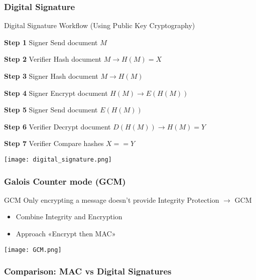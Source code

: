 \subsubsection{Digital Signature}

\begin{KR}{Digital Signature Workflow (Using Public Key Cryptography)}

    \begin{minipage}{0.5\linewidth}
    \textbf{Step 1} Signer Send document $M$

    \textbf{Step 2} Verifier Hash document $M \rightarrow H(M) = X$

    \textbf{Step 3} Signer Hash document $M \rightarrow H(M)$

    \textbf{Step 4} Signer Encrypt document $H(M) \rightarrow E(H(M))$

    \textbf{Step 5} Signer Send document $E(H(M))$

    \textbf{Step 6} Verifier Decrypt document $D(H(M)) \rightarrow H(M) = Y$

    \textbf{Step 7} Verifier Compare hashes $X == Y$
    \end{minipage}
    \begin{minipage}{0.5\linewidth}
        \texttt{[image: digital\_signature.png]}
    \end{minipage}
\end{KR}



\subsubsection{Galois Counter mode (GCM)}

\begin{concept}{GCM}
    Only encrypting a message doesn't provide Integrity Protection $\rightarrow$ GCM
    \begin{itemize}
        \item Combine Integrity and Encryption
        \item Approach «Encrypt then MAC»
    \end{itemize}
\end{concept}

\texttt{[image: GCM.png]}

\subsubsection{Comparison: MAC vs Digital Signatures}

